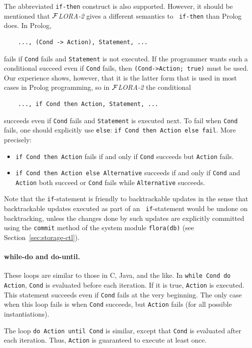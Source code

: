 \documentclass[11pt]{article}
\newcommand{\FLORA}{{\mbox{${\cal F}${\small\it LORA}\rm\emph{-2}}}\xspace}
\begin{document}
The abbreviated {\tt if-then} construct is also supported.  However, it
should be mentioned that \FLORA gives a different semantics to {\tt
  if-then} than Prolog does. In Prolog,
\begin{verbatim}
    ..., (Cond -> Action), Statement, ...  
\end{verbatim}
fails if {\tt Cond} fails and {\tt Statement} is not executed. If the
programmer wants such a conditional succeed even if {\tt Cond} fails, then
{\tt (Cond->Action; true)} must be used. Our experience shows, however,
that it is the latter form that is used in most cases in Prolog
programming, so in \FLORA the conditional
\begin{verbatim}
    ..., if Cond then Action, Statement, ...  
\end{verbatim}
succeeds even if {\tt Cond} fails and {\tt Statement} is executed next. To
fail when {\tt Cond} fails, one should explicitly use {\tt else}:
{\tt if Cond then Action else fail}. More precisely:
\begin{itemize}
  \item  {\tt if Cond then Action} fails if and only if {\tt Cond} succeeds
    but {\tt Action} fails.
  \item {\tt if Cond then Action else Alternative} succeeds if and only if 
    {\tt Cond} and {\tt Action} both succeed or {\tt Cond} fails while
    {\tt Alternative} succeeds.
\end{itemize}

Note that the {\tt if}-statement is friendly to backtrackable updates in
the sense that backtrackable updates executed as part of an {\tt
  if}-statement would be undone on backtracking, unless the changes done by
such updates are explicitly committed using the {\tt commit} method of the
system module {\tt flora(db)} (see Section~\ref{sec:storage-ctl}).

\paragraph{while-do and do-until.}
These loops are similar to those in C, Java, and the like.
In {\tt while Cond do Action}, {\tt Cond} is evaluated before each
iteration. If it is true, {\tt Action} is executed. This statement succeeds
even if {\tt Cond} fails at the very beginning. The only case when this
loop fails is when {\tt Cond} succeeds, but {\tt Action} fails (for all
possible instantiations).

The loop {\tt do Action until Cond} is similar, except that {\tt Cond} is
evaluated after each iteration. Thus, {\tt Action} is guaranteed to execute
at least once.
\end{document}
